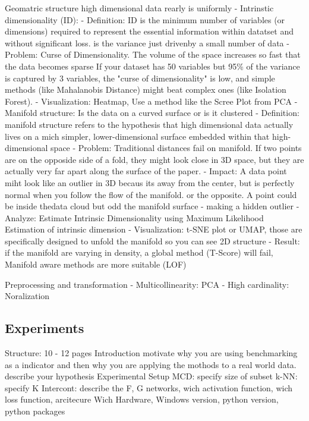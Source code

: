     Geomatric structure
        high dimensional data rearly is uniformly
        - Intrinstic dimensionality (ID): 
            - Definition: ID is the minimum number of variables (or dimensions) required to represent the essential information within datatset and without significant loss.
                is the variance just drivenby a small number of data
            - Problem: Curse of Dimensionality. The volume of the space increases so fast that the data becomes sparse
                If your dataset has 50 variables but 95\% of the variance is captured by 3 variables, the "curse of dimensionality" is low, and simple methods (like Mahalanobis Distance) might beat complex ones (like Isolation Forest).
            - Visualization: Heatmap, Use a method like the Scree Plot from PCA
        - Manifold structure: Is the data on a curved surface or is it clustered
            - Definition: manifold structure refers to the hypothesis that high dimensional data actually lives on a mich simpler, lower-dimensional surface embedded within that high-dimensional space
            - Problem: Traditional distances fail on manifold. If two points are on the opposide side of a fold, they might look close in 3D space, but they are actually very far apart along the surface of the paper.
            - Impact: A data point miht look like an outlier in 3D becaus its away from the center, but is perfectly normal when you follow the flow of the manifold. 
                or the opposite. A point could be inside thedata cloud but odd the manifold surface - making a hidden outlier
            - Analyze: Estimate Intrinsic Dimensionality using Maximum Likelihood Estimation of intrinsic dimension
            - Visualization: t-SNE plot or UMAP, those are specifically designed to unfold the manifold so you can see 2D structure 
            - Result: if the manifold are varying in density, a global method (T-Score) will fail, Manifold aware methods are more suitable (LOF) 
            
            
    Preprocessing and transformation
        - Multicollinearity: PCA
        - High cardinality: Noralization


\subsection{Experiments}
Structure: 10 - 12 pages
    Introduction
       motivate why you are using benchmarking as a indicator and then why you are applying the mothods to a real world data.
       describe your hypothesis
    Experimental Setup  
        MCD: specify size of subset 
        k-NN: specify K
        Intercont: describe the F, G networks, wich activation function, wich loss function, arcitecure
        Wich Hardware, Windows version, python version, python packages


